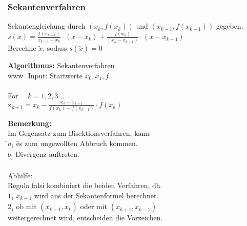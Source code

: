 \documentclass[10pt,a4paper]{article}
\begin{document}
\subsubsection{Sekantenverfahren}
Sekantengleichung durch $(x_k, f(x_k))$ und $(x_{k-1}, f(x_{k-1}))$ gegeben.
\newline
\\$s(x)=\frac{f(x_{k-1})}{x_{k-1}-x_k} \cdot (x-x_k)+\frac{f(x_k)}{(x_k-x_{k-1})}\cdot (x-x_{k-1})$
\newline
\\Berechne $\tilde x$, sodass $s(\tilde x)=0$
\begin{tabbing}
\textbf{Algorithmus:} Sekantenverfahren\\
www \= \kill
Input: Startwerte $x_0, x_1, f$\\
\newline
\\\> For \ \ \=$k=1,2,3...$\\ 
\> \> $\mathrm{x_{k+1}}= x_k - \frac{x_k-x_{k-1}}{f(x_k)-f(x_{k-1})} \cdot f(x_k)$ \\
\end{tabbing}
\begin{tabbing}
\textbf{Bemerkung:}
\\Im Gegensatz zum Bisektionsverfahren, kann \\
\hspace*{8mm} \=$a_)$ \= es zum ungewollten Abbruch kommen.\\
\>$b_)$ Divergenz auftreten.\\
\newline
\\Abhilfe:
\\Regula falsi kombiniert die beiden Verfahren, dh.\\
\>$1_)$ \=$x_{k+1}$ wird aus der Sekantenformel berechnet.\\
\>$2_)$ \> ob mit $(x_{k+1},x_k)$ oder mit $(x_{k+1},x_{k-1})$\\
\>\> weitergerechnet wird, entscheiden die Vorzeichen.\\
\end{tabbing}
\end{document}
